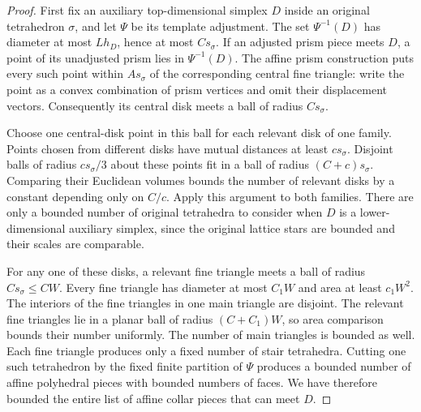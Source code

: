 \documentclass[11pt]{article}
\numberwithin{equation}{section}
\theoremstyle{definition}
\theoremstyle{remark}
\begin{document}
\begin{proof}
First fix an auxiliary top-dimensional simplex $D$ inside an original
tetrahedron $\sigma$, and let $\Psi$ be its template adjustment.  The
set $\Psi^{-1}(D)$ has diameter at most $L h_D$, hence at most
$C s_\sigma$.  If an adjusted prism piece meets $D$, a point of its
unadjusted prism lies in $\Psi^{-1}(D)$.  The affine prism construction
puts every such point within $A s_\sigma$ of the corresponding central
fine triangle: write the point as a convex combination of prism
vertices and omit their displacement vectors.  Consequently its
central disk meets a ball of radius $C s_\sigma$.

Choose one central-disk point in this ball for each relevant disk of
one family.  Points chosen from different disks have mutual distances
at least $c s_\sigma$.  Disjoint balls of radius $c s_\sigma/3$ about
these points fit in a ball of radius $(C+c)s_\sigma$.  Comparing their
Euclidean volumes bounds the number of relevant disks by a constant
depending only on $C/c$.  Apply this argument to both families.
There are only a bounded number of original tetrahedra to consider
when $D$ is a lower-dimensional auxiliary simplex, since the original
lattice stars are bounded and their scales are comparable.

For any one of these disks, a relevant fine triangle meets a ball of
radius $C s_\sigma\leq C W$.  Every fine triangle has diameter at most
$C_1W$ and area at least $c_1W^2$.  The interiors of the fine triangles
in one main triangle are disjoint.  The relevant fine triangles lie
in a planar ball of radius $(C+C_1)W$, so area comparison bounds their
number uniformly.  The number of main triangles is bounded as well.
Each fine triangle produces only a fixed number of stair tetrahedra.
Cutting one such tetrahedron by the fixed finite partition of $\Psi$
produces a bounded number of affine polyhedral pieces with bounded
numbers of faces.  We have therefore bounded the entire list of
affine collar pieces that can meet $D$.


\end{proof}
\end{document}
